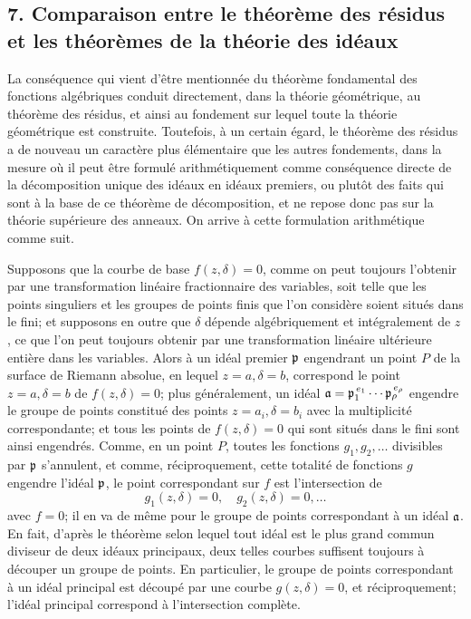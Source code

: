 \subsection*{7. Comparaison entre le théorème des résidus et les théorèmes de la théorie des idéaux}

La conséquence qui vient d'être mentionnée du \og{}théorème fondamental des fonctions algébriques\fg{} conduit directement, dans la théorie géométrique, au \og{}théorème des résidus\fg{}, et ainsi au fondement sur lequel toute la théorie géométrique est construite. Toutefois, à un certain égard, le théorème des résidus a de nouveau un caractère plus élémentaire que les autres fondements, dans la mesure où il peut être formulé arithmétiquement comme conséquence directe de la décomposition unique des idéaux en idéaux premiers, ou plutôt des faits qui sont à la base de ce théorème de décomposition, et ne repose donc pas sur la théorie supérieure des anneaux. On arrive à cette formulation arithmétique comme suit.

Supposons que la courbe de base \(f(z,\delta)=0\), comme on peut toujours l'obtenir par une transformation linéaire fractionnaire des variables, soit telle que les points singuliers et les groupes de points finis que l'on considère soient situés dans le fini; et supposons en outre que \(\delta\) dépende algébriquement et intégralement de \(z\), ce que l'on peut toujours obtenir par une transformation linéaire ultérieure entière dans les variables. Alors à un idéal premier \(\mathfrak p\) engendrant un point \(P\) de la surface de Riemann absolue, en lequel \(z=a,\delta=b\), correspond le point \(z=a,\delta=b\) de \(f(z,\delta)=0\); plus généralement, un idéal \(\mathfrak a=\mathfrak p_1^{\,e_1}\cdots\mathfrak p_\rho^{\,e_\rho}\) engendre le groupe de points constitué des points \(z=a_i,\delta=b_i\) avec la multiplicité correspondante; et tous les points de \(f(z,\delta)=0\) qui sont situés dans le fini sont ainsi engendrés. Comme, en un point \(P\), toutes les fonctions \(g_1,g_2,\ldots\) divisibles par \(\mathfrak p\) s'annulent, et comme, réciproquement, cette totalité de fonctions \(g\) engendre l'idéal \(\mathfrak p\), le point correspondant sur \(f\) est l'intersection de
\[
g_1(z,\delta)=0,\quad g_2(z,\delta)=0,\ldots
\]
avec \(f=0\); il en va de même pour le groupe de points correspondant à un idéal \(\mathfrak a\). En fait, d'après le théorème selon lequel tout idéal est le plus grand commun diviseur de deux idéaux principaux, deux telles courbes suffisent toujours à découper un groupe de points. En particulier, le groupe de points correspondant à un idéal principal est découpé par une courbe \(g(z,\delta)=0\), et réciproquement; l'idéal principal correspond à l'intersection complète.

